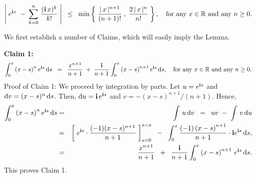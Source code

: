 \begin{lemma}
\label{BillingsleyThreeFourThree}
\mbox{}\vskip 0.2cm
\noindent
\begin{equation*}
\left\vert\;e^{\textnormal{\bf i} x} \;-\; \sum_{k = 0}^{n}\,\dfrac{(\textnormal{\bf i}\,x)^{k}}{k!} \;\right\vert
\;\;\leq\;\;
\min\left\{\;\dfrac{\vert\,x\,\vert^{n+1}}{(n+1)!}\;,\;\dfrac{2\,\vert\,x\,\vert^{n}}{n!}\;\right\},
\quad
\textnormal{for any $x \in \mathbb{R}$ and any $n \geq 0$.}
\end{equation*}
\end{lemma}
\proof
We first establish a number of Claims, which will easily imply the Lemma.

\vskip 0.5cm
\noindent
\textbf{Claim 1:}
\begin{equation*}
\int_{0}^{x}\left(x-s\right)^{n}e^{\textnormal{\bf i} s}\,\textnormal{d} s
\;\;=\;\;
\dfrac{x^{n+1}}{n+1} \;+\; \dfrac{\textnormal{\bf i}}{n+1}\int_{0}^{x}\left(x-s\right)^{n+1}e^{\textnormal{\bf i} s}\,\textnormal{d} s,
\quad
\textnormal{for any $x \in \mathbb{R}$ and any $n \geq 0$.}
\end{equation*}
{\small Proof of Claim 1: We proceed by integration by parts.
Let $u = e^{\textnormal{\bf i} s}$ and $\textnormal{d} v = (x-s)^{n}\,\textnormal{d} s$.
Then, $\textnormal{d} u = \textnormal{\bf i}\,e^{\textnormal{\bf i} s}$ and $v = -(x-s)^{n+1}/(n+1)$.
Hence,
\begin{eqnarray*}
\int_{0}^{x}\left(x-s\right)^{n}e^{\textnormal{\bf i} s}\,\textnormal{d} s
&=& \int\,u\,\textnormal{d} v
\;\;=\;\; uv \; - \; \int\,v\,\textnormal{d} u
\\
&=&
\left[\;e^{\textnormal{\bf i} s}\cdot\dfrac{(-1)(x-s)^{n+1}}{n+1}\;\right]_{s=0}^{s=x}
\;\; - \;\; \int_{0}^{x}\dfrac{(-1)\left(x-s\right)^{n+1}}{n+1}\cdot\textnormal{\bf i} e^{\textnormal{\bf i} s}\,\textnormal{d} s,
\\
&=&
\dfrac{x^{n+1}}{n+1} \;\; + \;\; \dfrac{\textnormal{\bf i}}{n+1}\int_{0}^{x}\left(x-s\right)^{n+1}\,e^{\textnormal{\bf i} s}\,\textnormal{d} s.
\end{eqnarray*}
This proves Claim 1.
}

